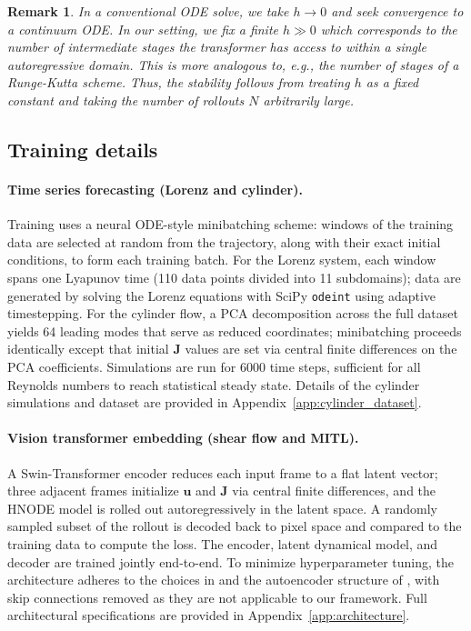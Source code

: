 \documentclass[12pt]{article}
\newtheorem{remark}{Remark}
\begin{document}
\begin{remark}
    In a conventional ODE solve, we take $h\rightarrow 0$ and seek convergence to a continuum ODE. In our setting, we fix a finite $h \gg 0$ which corresponds to the number of intermediate stages the transformer has access to within a single autoregressive domain. This is more analogous to, e.g., the number of stages of a Runge-Kutta scheme. Thus, the stability follows from treating $h$ as a fixed constant and taking the number of rollouts $N$ arbitrarily large.
\end{remark}

\subsection{Training details}

\paragraph{Time series forecasting (Lorenz and cylinder).}
Training uses a neural ODE-style minibatching scheme: windows of the training data are selected at random from the trajectory, along with their exact initial conditions, to form each training batch. For the Lorenz system, each window spans one Lyapunov time (110 data points divided into 11 subdomains); data are generated by solving the Lorenz equations with SciPy \texttt{odeint} using adaptive timestepping. For the cylinder flow, a PCA decomposition across the full dataset yields 64 leading modes that serve as reduced coordinates; minibatching proceeds identically except that initial $\mathbf{J}$ values are set via central finite differences on the PCA coefficients. Simulations are run for $6000$ time steps, sufficient for all Reynolds numbers to reach statistical steady state. Details of the cylinder simulations and dataset are provided in Appendix~\ref{app:cylinder_dataset}.

\paragraph{Vision transformer embedding (shear flow and MITL).}
A Swin-Transformer encoder reduces each input frame to a flat latent vector; three adjacent frames initialize $\mathbf{u}$ and $\mathbf{J}$ via central finite differences, and the HNODE model is rolled out autoregressively in the latent space. A randomly sampled subset of the rollout is decoded back to pixel space and compared to the training data to compute the loss. The encoder, latent dynamical model, and decoder are trained jointly end-to-end. To minimize hyperparameter tuning, the architecture adheres to the choices in \cite{Liu_2021_ICCV} and the autoencoder structure of \cite{10.1007/978-3-031-25066-8_9}, with skip connections removed as they are not applicable to our framework. Full architectural specifications are provided in Appendix~\ref{app:architecture}.
\end{document}
